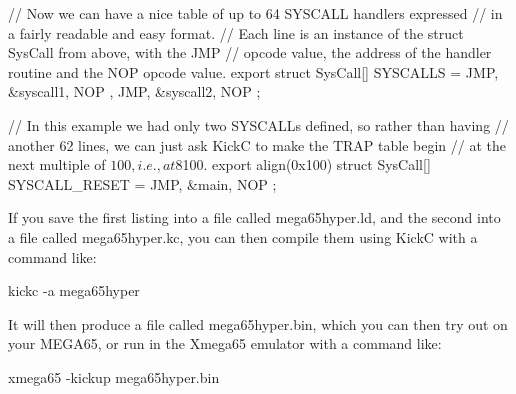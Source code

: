 \begin{screenoutput}
// Now we can have a nice table of up to 64 SYSCALL handlers expressed
// in a fairly readable and easy format.
// Each line is an instance of the struct SysCall from above, with the JMP
// opcode value, the address of the handler routine and the NOP opcode value.
export struct SysCall[] SYSCALLS = {
    { JMP, &syscall1, NOP },
    { JMP, &syscall2, NOP }
    };

// In this example we had only two SYSCALLs defined, so rather than having
// another 62 lines, we can just ask KickC to make the TRAP table begin
// at the next multiple of $100, i.e., at $8100. 
export align(0x100) struct SysCall[] SYSCALL_RESET = {
    { JMP, &main, NOP }
};
\end{screenoutput}

If you save the first listing into a file called mega65hyper.ld, and the second
into a file called mega65hyper.kc, you can then compile them using KickC with
a command like:

\begin{screenoutput}
  kickc -a mega65hyper
\end{screenoutput}

It will then produce a file called mega65hyper.bin, which you can then try out
on your MEGA65, or run in the Xmega65 emulator with a command like:

\begin{screenoutput}
  xmega65 -kickup mega65hyper.bin
\end{screenoutput}

